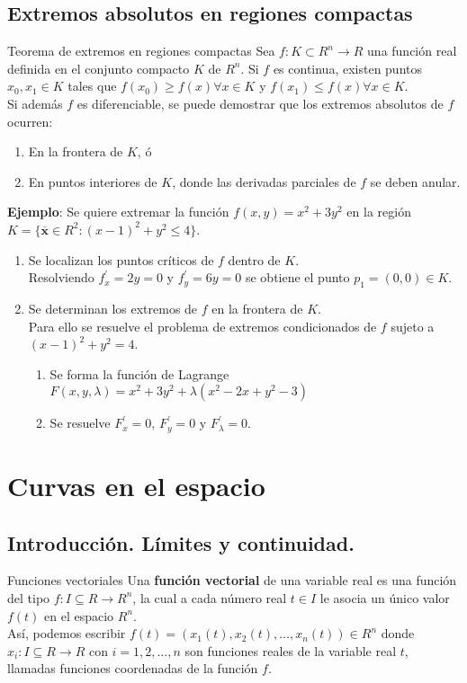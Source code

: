 \documentclass[a4paper, twoside]{article}
\numberwithin{equation}{section}
\numberwithin{figure}{section}
\numberwithin{table}{section}
\newcommand{\vect}[1]{\overline{\textbf{#1}}}
\begin{document}
\subsection{Extremos absolutos en regiones compactas}
\begin{teorema*}{Teorema de extremos en regiones compactas}
	Sea $f:K\subset R^n \to R$ una función real definida en el conjunto compacto $K$ de $R^n$. Si $f$ es continua, existen puntos $x_0,x_1 \in K$ tales que $f(x_0) \ge f(x) \forall x \in K$ y $f(x_1) \le f(x) \forall x \in K.$\\
	
	Si además $f$ es diferenciable, se puede demostrar que los extremos absolutos de $f$ ocurren:
	\begin{enumerate}
		\item En la frontera de $K$, ó
		\item En puntos interiores de $K$, donde las derivadas parciales de $f$ se deben anular.
	\end{enumerate}
\end{teorema*}

\textbf{Ejemplo}: Se quiere extremar la función $f(x,y)=x^{2}+3y^{2}$ en la región $K=\{\vect{x}\in R^2:(x-1)^2+y^2 \leq4\}$.\\

\begin{enumerate}
	\item Se localizan los puntos críticos de $f$ dentro de $K$.\\
		Resolviendo $f^\prime_x=2y=0$ y $f^\prime_y=6y=0$ se obtiene el punto $p_1=(0,0) \in K$.
	\item Se determinan los extremos de $f$ en la frontera de $K$.\\
		Para ello se resuelve el problema de extremos condicionados de $f$ sujeto a $(x-1)^2+y^2=4$.
		\begin{enumerate}
			\item Se forma la función de Lagrange $F(x,y,\lambda)=x^2+3y^2+\lambda(x^2-2x+y^2-3)$
			\item Se resuelve $F^\prime_x=0$, $F^\prime_y=0$ y $F^\prime_{\lambda}=0$.
		\end{enumerate}
\end{enumerate}

\newpage
\section{Curvas en el espacio}
\subsection{Introducción. Límites y continuidad.}
\begin{definicion*}{Funciones vectoriales}
	Una \textbf{función vectorial} de una variable real es una función del tipo $f:I\subseteq R \to R^n$, la cual a cada número real $t \in I$ le asocia un único valor $f(t)$ en el espacio $R^n$.\\
	Así, podemos escribir $f(t)=(x_1(t),x_2(t),\ldots,x_n(t)) \in R^n$ donde $x_i:I\subseteq R \to R$ con $i=1,2,\ldots,n$ son funciones reales de la variable real $t$, llamadas funciones coordenadas de la función $f$.
\end{definicion*}
\end{document}
